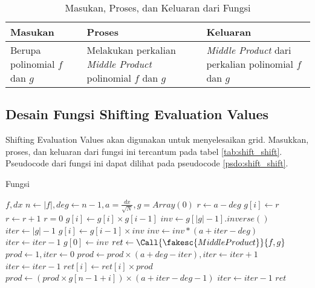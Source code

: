 \begin{table}[]	
	\Centering
	\begin{tabular}{|p{3cm}|p{3cm}|p{3cm}|}
	\hline
	Masukan & Proses & Keluaran \\ \hline
	Berupa polinomial $ f $ dan $ g $ & Melakukan perkalian \textit{Middle Product} polinomial $ f $ dan $ g $ & \textit{Middle Product} dari perkalian polinomial $ f $ dan $ g $ \\ \hline
	\end{tabular}
	\caption{Masukan, Proses, dan Keluaran dari Fungsi }
	\label{tab:shift_mp}
\end{table}

\subsection{Desain Fungsi Shifting Evaluation Values}
Shifting Evaluation Values akan digunakan untuk menyelesaikan grid. Masukkan, proses, dan keluaran dari fungsi ini tercantum pada tabel \ref{tab:shift_shift}. Pseudocode dari fungsi ini dapat dilihat pada pseudocode \ref{psdo:shift_shift}. 

\begin{algorithm}
	\caption{Fungsi }
	\label{psdo:shift_shift}
	\begin{algorithmic}[1]
		\Require $ f, dx $
		\State $ n \leftarrow |f| , deg \leftarrow n - 1, a = \frac{dx}{\sqrt{N}}, g = Array(0)$
		\State $ r \leftarrow a - deg $
			\State $ g[i] \leftarrow r $
			\State $ r \leftarrow r + 1$
			 $ r = 0 $
			\EndIf
		\EndFor
		 $ g[i] \leftarrow g[i] \times g[i-1]$
		\EndFor
		\State $ inv \leftarrow g[|g|-1].inverse() $
		\State $ iter \leftarrow |g|-1 $
			\State $ g[i] \leftarrow g[i-1] \times inv $
			\State $ inv \leftarrow inv * (a + iter - deg) $
			\State $ iter \leftarrow iter - 1 $
		\EndFor
		\State $ g[0] \leftarrow inv $
		\State $ ret \leftarrow \Call{\fakesc{MiddleProduct}}{f, g}$
		\State $ prod \leftarrow 1, iter \leftarrow 0 $
		\State $ prod \leftarrow prod \times (a + deg -iter), iter \leftarrow iter + 1$
		\EndFor 
		\State $ iter \leftarrow iter - 1$
			\State $ ret[i] \leftarrow ret[i] \times prod $
			\State $ prod \leftarrow (prod \times g[n - 1 + i]) \times (a + iter - deg - 1)$
			\State $ iter \leftarrow iter - 1 $
		\EndFor 
		\State \Return $ret$
	\end{algorithmic}
\end{algorithm}

